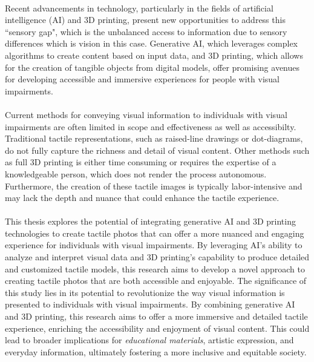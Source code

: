 \documentclass[12pt, letterpaper]{article}
\begin{document}
\begin{spacing}{1.15}
\paragraph{}
Recent advancements in technology, particularly in the fields of artificial intelligence (AI) and 3D printing, present new opportunities to
address this ``sensory gap", which is the unbalanced access to information due to sensory differences which is vision in this case.
 Generative AI, which leverages complex algorithms to create content based on input data, and 3D printing, which allows for
the creation of tangible objects from digital models, offer promising avenues for developing accessible and immersive experiences for people
with visual impairments.
\paragraph{}
Current methods for conveying visual information to individuals with visual impairments are often limited in scope and effectiveness as well as accessibilty.
Traditional tactile representations, such as raised-line drawings or dot-diagrams, do not fully capture the richness and detail of visual content. Other methods
such as full 3D printing is either time consuming or requires the expertise of a knowledgeable person, which does not render the process autonomous.
Furthermore, the creation of these tactile images is typically labor-intensive and may lack the depth and nuance that could enhance the
tactile experience.
\paragraph{}
This thesis explores the potential of integrating generative AI and 3D printing technologies to create tactile photos that can offer a more
nuanced and engaging experience for individuals with visual impairments. By leveraging AI's ability to analyze and interpret visual data and
3D printing's capability to produce detailed and customized tactile models, this research aims to develop a novel approach to creating tactile
photos that are both accessible and enjoyable.
The significance of this study lies in its potential to revolutionize the way visual information is presented to individuals with visual
impairments. By combining generative AI and 3D printing, this research aims to offer a more immersive and detailed tactile experience,
enriching the accessibility and enjoyment of visual content. This could lead to broader implications for \emph{educational materials}, artistic
expression, and everyday information, ultimately fostering a more inclusive and equitable society.

\end{spacing}
\end{document}
